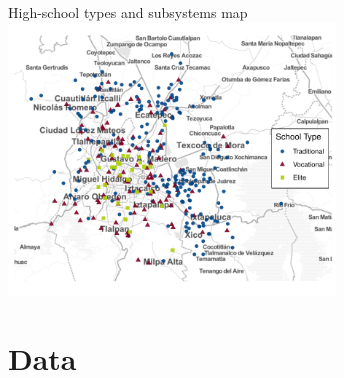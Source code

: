 \documentclass[notes,11pt, aspectratio=169]{beamer}
\begin{document}
\begin{frame}{High-school types and subsystems map}
    \centering
    \includegraphics[width=0.65\textwidth]{04_Figures/comipems_type_map_ggmap.pdf}
\end{frame}




\section{Data}
\end{document}

